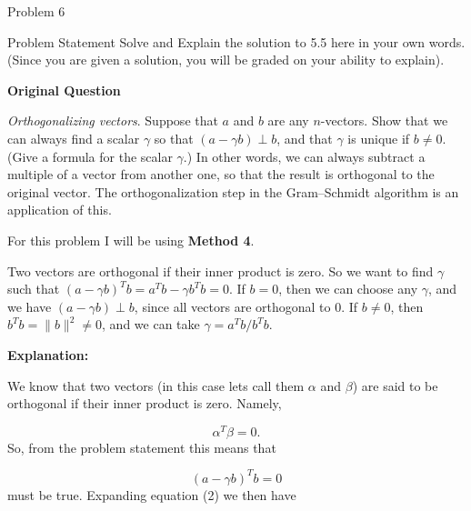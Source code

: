 \begin{problem}{Problem 6}
    \begin{statement}{Problem Statement}
        Solve and Explain the solution to 5.5 here in your own words. (Since you are given a solution, you will be graded on your ability to explain). \vspace*{1em}

        \textbf{Original Question} \vspace*{1em}

        \textit{Orthogonalizing vectors}. Suppose that $a$ and $b$ are any $n$-vectors. Show that we can always find a scalar $\gamma$ so that $(a - \gamma b) \perp b$, and that $\gamma$ is unique if 
        $b \neq 0$. (Give a formula for the scalar $\gamma$.) In other words, we can always subtract a multiple of a vector from another one, so that the result is orthogonal to the original vector. 
        The orthogonalization step in the Gram–Schmidt algorithm is an application of this.
    \end{statement}

    \begin{Highlight}[Solution]
        For this problem I will be using \textbf{Method 4}. \vspace*{1em}

        Two vectors are orthogonal if their inner product is zero. So we want to find $\gamma$ such that $(a - \gamma b)^{T}b = a^{T}b - \gamma b^{T}b = 0$. If $b = 0$, then we can choose any $\gamma$, 
        and we have $(a - \gamma b) \perp b$, since all vectors are orthogonal to 0. If $b \neq 0$, then $b^{T}b = \| b \|^{2} \neq 0$, and we can take $\gamma = a^{T}b / b^{T}b$. \vspace*{1em}

        \textbf{Explanation:} \vspace*{1em}

        We know that two vectors (in this case lets call them $\alpha$ and $\beta$) are said to be orthogonal if their inner product is zero. Namely,

        \setcounter{equation}{0}
        \begin{equation}
            \alpha^{T}\beta = 0.
        \end{equation}
        So, from the problem statement this means that

        \begin{equation}
            (a - \gamma b)^{T}b = 0
        \end{equation}
        must be true. Expanding equation (2) we then have


\end{Highlight}
\end{problem}
